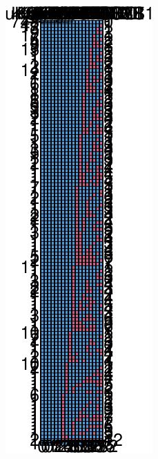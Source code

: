 \documentclass[
]{article}
\begin{document}
\includegraphics{withmice_files/figure-latex/unnamed-chunk-6-1.pdf}
\end{document}
